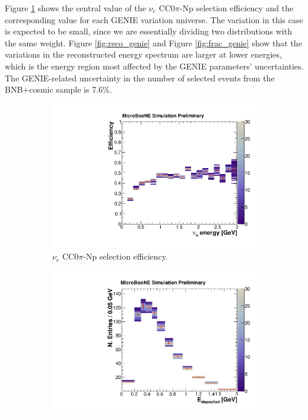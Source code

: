 Figure \ref{fig:eff_genie} shows the central value of the $\nu_{e}$ CC0$\pi$-Np selection efficiency and the corresponding value for each GENIE variation universe. The variation in this case is expected to be small, since we are essentially dividing two distributions with the same weight. Figure \ref{fig:reco_genie} and Figure \ref{fig:frac_genie} show that the variations in the reconstructed energy spectrum are larger at lower energies, which is the energy region most affected by the GENIE parameters' uncertainties. The GENIE-related uncertainty in the number of selected events from the BNB+cosmic sample is 7.6\%.


\begin{figure}[htbp]
  \begin{center}
    \begin{subfigure}{0.45\textwidth}
      \includegraphics[width=\linewidth]{figures/eff_ene_genie.pdf}
      \caption{$\nu_{e}$ CC0$\pi$-Np selection efficiency.}  \label{fig:eff_genie}
    \end{subfigure}
    \begin{subfigure}{0.45\textwidth}
      \includegraphics[width=\linewidth]{figures/reco_genie.pdf}

\end{subfigure}
\end{center}
\end{figure}
